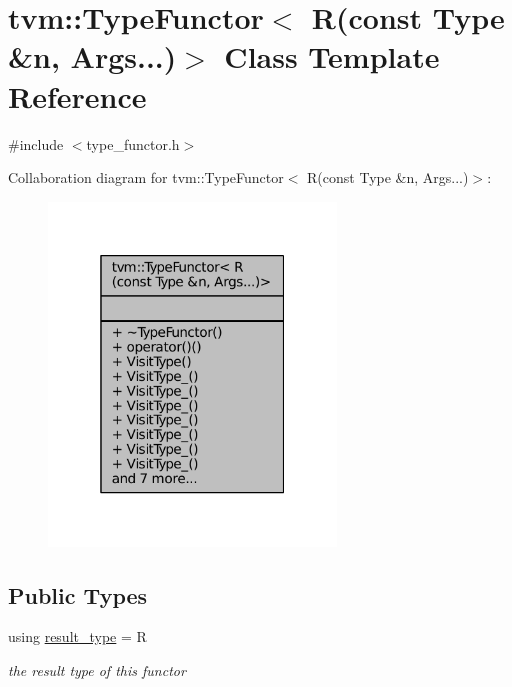 \hypertarget{classtvm_1_1TypeFunctor_3_01R_07const_01Type_01_6n_00_01Args_8_8_8_08_4}{}\section{tvm\+:\+:Type\+Functor$<$ R(const Type \&n, Args...)$>$ Class Template Reference}
\label{classtvm_1_1TypeFunctor_3_01R_07const_01Type_01_6n_00_01Args_8_8_8_08_4}


{\ttfamily \#include $<$type\+\_\+functor.\+h$>$}



Collaboration diagram for tvm\+:\+:Type\+Functor$<$ R(const Type \&n, Args...)$>$\+:
\nopagebreak
\begin{figure}[H]
\begin{center}
\leavevmode
\includegraphics[width=217pt]{classtvm_1_1TypeFunctor_3_01R_07const_01Type_01_6n_00_01Args_8_8_8_08_4__coll__graph}
\end{center}
\end{figure}
\subsection*{Public Types}
\begin{DoxyCompactItemize}
\item 
using \hyperlink{classtvm_1_1TypeFunctor_3_01R_07const_01Type_01_6n_00_01Args_8_8_8_08_4_a24d4a3522ee6c4cdeed80dcdcc1424ad}{result\+\_\+type} = R
\begin{DoxyCompactList}\small\item\em the result type of this functor \end{DoxyCompactList}\end{DoxyCompactItemize}
